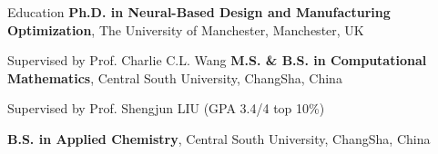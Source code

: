 \begin{rubric}{Education}
\entry*[2023 -- Now]%
	\textbf{Ph.D. in Neural-Based Design and Manufacturing Optimization}, The University of Manchester, Manchester, UK
	\par Supervised by Prof. Charlie C.L. Wang
%
%
	\textbf{M.S. \& B.S. in Computational Mathematics}, Central South University, ChangSha, China
	\par Supervised by Prof. Shengjun LIU (GPA 3.4/4 top 10\%)
	
%
	\textbf{B.S. in Applied Chemistry}, Central South University, ChangSha, China
%
\end{rubric}